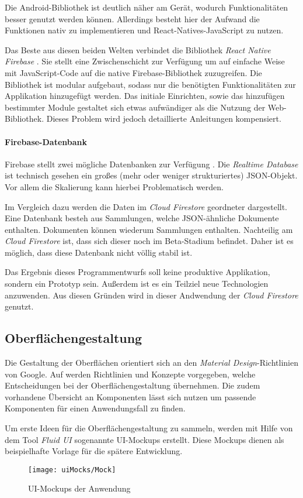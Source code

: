 Die Android-Bibliothek ist deutlich näher am Gerät, wodurch Funktionalitäten besser genutzt werden können.
Allerdings besteht hier der Aufwand die Funktionen nativ zu implementieren und React-Natives-JavaScript zu nutzen.

Das Beste aus diesen beiden Welten verbindet die Bibliothek \textit{React Native Firebase} \cite{invertas78:online}.
Sie stellt eine Zwischenschicht zur Verfügung um auf einfache Weise mit JavaScript-Code auf die native Firebase-Bibliothek zuzugreifen.
Die Bibliothek ist modular aufgebaut, sodass nur die benötigten Funktionalitäten zur Applikation hinzugefügt werden.
Das initiale Einrichten, sowie das hinzufügen bestimmter Module gestaltet sich etwas aufwändiger als die Nutzung der Web-Bibliothek.
Dieses Problem wird jedoch detaillierte Anleitungen kompensiert.

\paragraph{Firebase-Datenbank}
Firebase stellt zwei mögliche Datenbanken zur Verfügung \cite{ChooseaD77:online}.
Die \textit{Realtime Database} ist technisch gesehen ein großes (mehr oder weniger strukturiertes) JSON-Objekt.
Vor allem die Skalierung kann hierbei Problematisch werden.

Im Vergleich dazu werden die Daten im \textit{Cloud Firestore} geordneter dargestellt.
Eine Datenbank besteh aus Sammlungen, welche JSON-ähnliche Dokumente enthalten.
Dokumenten können wiederum Sammlungen enthalten.
Nachteilig am \textit{Cloud Firestore} ist, dass sich dieser noch im Beta-Stadium befindet.
Daher ist es möglich, dass diese Datenbank nicht völlig stabil ist.

Das Ergebnis dieses Programmentwurfs soll keine produktive Applikation, sondern ein Prototyp sein.
Außerdem ist es ein Teilziel neue Technologien anzuwenden.
Aus diesen Gründen wird in dieser Andwendung der \textit{Cloud Firestore} genutzt.

\subsection{Oberflächengestaltung}
Die Gestaltung der Oberflächen orientiert sich an den \textit{Material Design}-Richtlinien von Google.
Auf \cite{DesignMa49:online} werden Richtlinien und Konzepte vorgegeben,
welche Entscheidungen bei der Oberflächengestaltung übernehmen.
Die zudem vorhandene Übersicht an Komponenten lässt sich nutzen um passende Komponenten für einen Anwendungsfall zu finden.

Um erste Ideen für die Oberflächengestaltung zu sammeln,
werden mit Hilfe von dem Tool \textit{Fluid UI} \cite{FluidUIc8:online} sogenannte UI-Mockups erstellt.
Diese Mockups dienen als beispielhafte Vorlage für die spätere Entwicklung.


\begin{figure}[h]
    \centering
    \texttt{[image: uiMocks/Mock]}
    \caption{UI-Mockups der Anwendung}
\end{figure}



